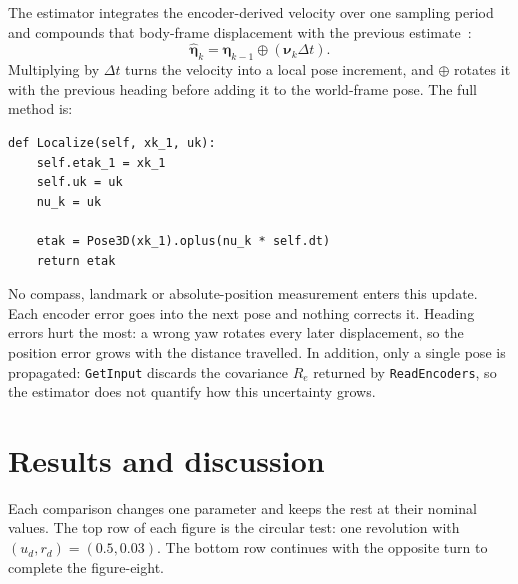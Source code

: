 \documentclass[letterpaper,12pt]{article}
\newcommand{\opluspose}{\mathbin{\oplus}}
\begin{document}
The estimator integrates the encoder-derived velocity over one sampling period
and compounds that body-frame displacement with the previous
estimate~\cite[p.~37]{slidesIntro}:
\begin{equation}
    \widehat{\boldsymbol{\eta}}_k
    =\widehat{\boldsymbol{\eta}}_{k-1}
    \opluspose
    \left(\boldsymbol{\nu}_k\Delta t\right).
    \label{eq:dead-reckoning}
\end{equation}
Multiplying by $\Delta t$ turns the velocity into a local pose increment, and
$\oplus$ rotates it with the previous heading before adding it to the
world-frame pose. The full method is:
\begin{lstlisting}[caption={Complete \texttt{Localize} implementation.}]
def Localize(self, xk_1, uk):
    self.etak_1 = xk_1
    self.uk = uk
    nu_k = uk

    etak = Pose3D(xk_1).oplus(nu_k * self.dt)
    return etak
\end{lstlisting}

No compass, landmark or absolute-position measurement enters this update.
Each encoder error goes into the next pose and nothing corrects it. Heading
errors hurt the most: a wrong yaw rotates every later displacement, so the
position error grows with the distance travelled. In addition, only a single
pose is propagated: \texttt{GetInput} discards the covariance $R_e$ returned by
\texttt{ReadEncoders}, so the estimator does not quantify how this
uncertainty grows.

\section{Results and discussion}
\label{sec:results}

Each comparison changes one parameter and keeps the rest at their nominal
values. The top row of each figure is the circular test: one revolution with
$(u_d,r_d)=(0.5,0.03)$. The bottom row continues with the opposite turn to
complete the figure-eight.
\end{document}
